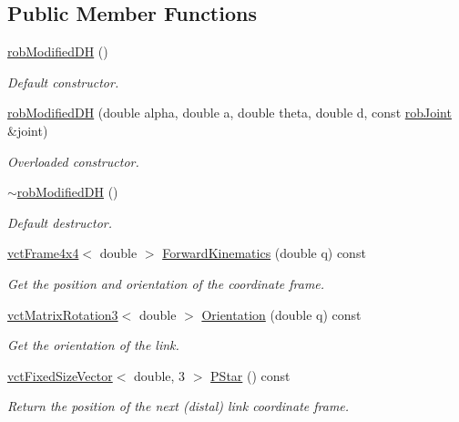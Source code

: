 \subsection*{Public Member Functions}
\begin{DoxyCompactItemize}
\item 
\hyperlink{classrob_modified_d_h_a9166dfe0206f859756ff39bdd416a746}{rob\-Modified\-D\-H} ()
\begin{DoxyCompactList}\small\item\em Default constructor. \end{DoxyCompactList}\item 
\hyperlink{classrob_modified_d_h_a81eecf344a9e299d14a5d6fdaaee3fed}{rob\-Modified\-D\-H} (double alpha, double a, double theta, double d, const \hyperlink{classrob_joint}{rob\-Joint} \&joint)
\begin{DoxyCompactList}\small\item\em Overloaded constructor. \end{DoxyCompactList}\item 
\hyperlink{classrob_modified_d_h_a382df42ece3ea09583a792305d925c59}{$\sim$rob\-Modified\-D\-H} ()
\begin{DoxyCompactList}\small\item\em Default destructor. \end{DoxyCompactList}\item 
\hyperlink{classvct_frame4x4}{vct\-Frame4x4}$<$ double $>$ \hyperlink{classrob_modified_d_h_a05b59134f01d068b6e03c54443efa0f9}{Forward\-Kinematics} (double q) const 
\begin{DoxyCompactList}\small\item\em Get the position and orientation of the coordinate frame. \end{DoxyCompactList}\item 
\hyperlink{classvct_matrix_rotation3}{vct\-Matrix\-Rotation3}$<$ double $>$ \hyperlink{classrob_modified_d_h_ae93da4e3532ede4f828053e6a19ddd8a}{Orientation} (double q) const 
\begin{DoxyCompactList}\small\item\em Get the orientation of the link. \end{DoxyCompactList}\item 
\hyperlink{classvct_fixed_size_vector}{vct\-Fixed\-Size\-Vector}$<$ double, 3 $>$ \hyperlink{classrob_modified_d_h_a9cc8c123b2a4274181f15356875aea9e}{P\-Star} () const 
\begin{DoxyCompactList}\small\item\em Return the position of the next (distal) link coordinate frame. \end{DoxyCompactList}\item 

\end{DoxyCompactItemize}
